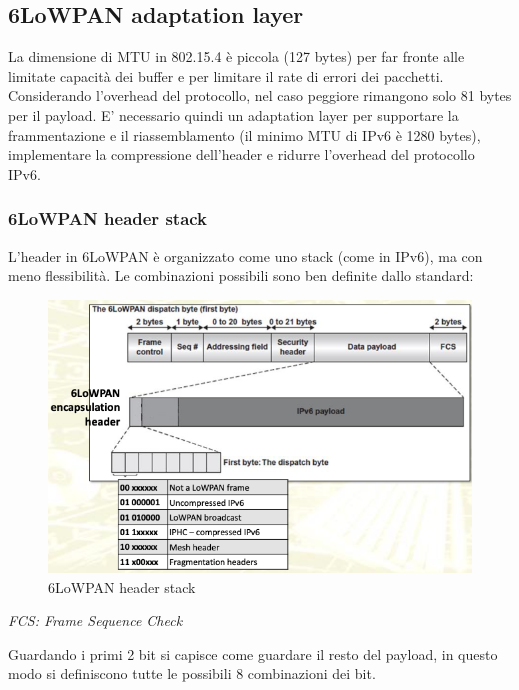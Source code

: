 \documentclass{article}
\begin{document}
\subsection{6LoWPAN adaptation layer}
La dimensione di MTU in 802.15.4 è piccola (127 bytes) per far fronte alle limitate capacità dei buffer e per limitare il rate di errori dei pacchetti. \\ Considerando l'overhead del protocollo, nel caso peggiore rimangono solo 81 bytes per il payload. E' necessario quindi un adaptation layer per supportare la frammentazione e il riassemblamento (il minimo MTU di IPv6 è 1280 bytes), implementare la compressione dell'header e ridurre l'overhead del protocollo IPv6. 

\subsubsection{6LoWPAN header stack}
L'header in 6LoWPAN è organizzato come uno stack (come in IPv6), ma con meno flessibilità. Le combinazioni possibili sono ben definite dallo standard:
\begin{figure}[H]
\centering
\includegraphics[scale=0.5]{figures/6lowpan header stack.png}
\caption{6LoWPAN header stack}
\end{figure}
\begin{center}
    \textit{FCS: Frame Sequence Check}
\end{center}
Guardando i primi 2 bit si capisce come guardare il resto del payload, in questo modo si definiscono tutte le possibili 8 combinazioni dei bit.
\end{document}
